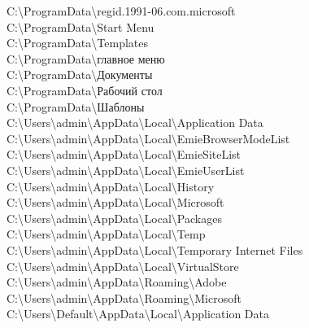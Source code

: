 C:\textbackslash ProgramData\textbackslash regid.1991-06.com.microsoft \\
C:\textbackslash ProgramData\textbackslash Start Menu \\
C:\textbackslash ProgramData\textbackslash Templates \\
C:\textbackslash ProgramData\textbackslash главное меню \\
C:\textbackslash ProgramData\textbackslash Документы \\
C:\textbackslash ProgramData\textbackslash Рабочий стол \\
C:\textbackslash ProgramData\textbackslash Шаблоны \\
C:\textbackslash Users\textbackslash admin\textbackslash AppData\textbackslash Local\textbackslash Application Data \\
C:\textbackslash Users\textbackslash admin\textbackslash AppData\textbackslash Local\textbackslash EmieBrowserModeList \\
C:\textbackslash Users\textbackslash admin\textbackslash AppData\textbackslash Local\textbackslash EmieSiteList \\
C:\textbackslash Users\textbackslash admin\textbackslash AppData\textbackslash Local\textbackslash EmieUserList \\
C:\textbackslash Users\textbackslash admin\textbackslash AppData\textbackslash Local\textbackslash History \\
C:\textbackslash Users\textbackslash admin\textbackslash AppData\textbackslash Local\textbackslash Microsoft \\
C:\textbackslash Users\textbackslash admin\textbackslash AppData\textbackslash Local\textbackslash Packages \\
C:\textbackslash Users\textbackslash admin\textbackslash AppData\textbackslash Local\textbackslash Temp \\
C:\textbackslash Users\textbackslash admin\textbackslash AppData\textbackslash Local\textbackslash Temporary Internet Files \\
C:\textbackslash Users\textbackslash admin\textbackslash AppData\textbackslash Local\textbackslash VirtualStore \\
C:\textbackslash Users\textbackslash admin\textbackslash AppData\textbackslash Roaming\textbackslash Adobe \\
C:\textbackslash Users\textbackslash admin\textbackslash AppData\textbackslash Roaming\textbackslash Microsoft \\
C:\textbackslash Users\textbackslash Default\textbackslash AppData\textbackslash Local\textbackslash Application Data \\
